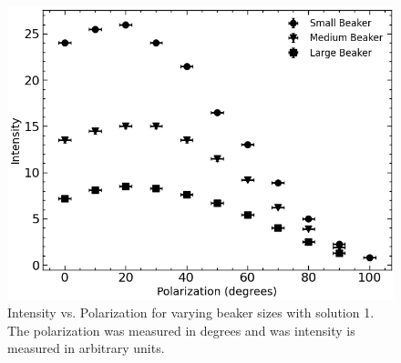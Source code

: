 \begin{figure}[H]
    \begin{center}
        \includegraphics[width=\columnwidth]{../figures/solution1.png}
    \end{center}
    \caption{Intensity vs. Polarization for varying beaker sizes with solution 1. The polarization was measured in degrees and was intensity is measured in arbitrary units.}
    \label{solution1_figure}
\end{figure}

